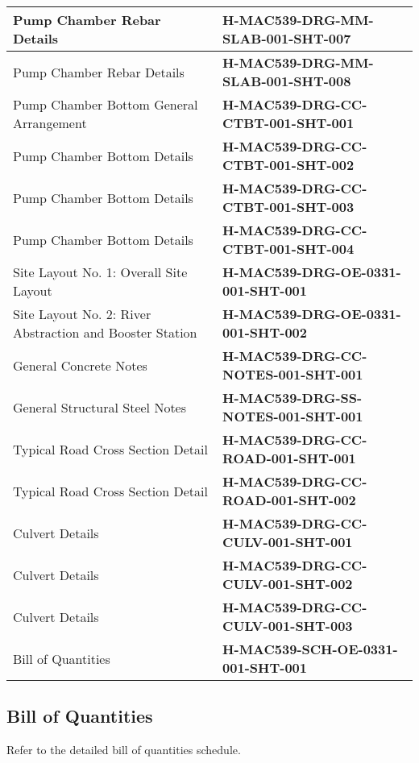 \documentclass{article}%
\begin{document}
\begin{flushleft}
\begin{minipage}{\textwidth}
\begin{tabular}{|l |l |}
Pump Chamber Rebar Details&\textbf{H{-}MAC539{-}DRG{-}MM{-}SLAB{-}001{-}SHT{-}007}\\%
\hline%
Pump Chamber Rebar Details&\textbf{H{-}MAC539{-}DRG{-}MM{-}SLAB{-}001{-}SHT{-}008}\\%
\hline%
Pump Chamber Bottom General Arrangement&\textbf{H{-}MAC539{-}DRG{-}CC{-}CTBT{-}001{-}SHT{-}001}\\%
\hline%
Pump Chamber Bottom Details&\textbf{H{-}MAC539{-}DRG{-}CC{-}CTBT{-}001{-}SHT{-}002}\\%
\hline%
Pump Chamber Bottom Details&\textbf{H{-}MAC539{-}DRG{-}CC{-}CTBT{-}001{-}SHT{-}003}\\%
\hline%
Pump Chamber Bottom Details&\textbf{H{-}MAC539{-}DRG{-}CC{-}CTBT{-}001{-}SHT{-}004}\\%
\hline%
Site Layout No. 1: Overall Site Layout&\textbf{H{-}MAC539{-}DRG{-}OE{-}0331{-}001{-}SHT{-}001}\\%
\hline%
Site Layout No. 2: River Abstraction and Booster Station&\textbf{H{-}MAC539{-}DRG{-}OE{-}0331{-}001{-}SHT{-}002}\\%
\hline%
General Concrete Notes&\textbf{H{-}MAC539{-}DRG{-}CC{-}NOTES{-}001{-}SHT{-}001}\\%
\hline%
General Structural Steel Notes&\textbf{H{-}MAC539{-}DRG{-}SS{-}NOTES{-}001{-}SHT{-}001}\\%
\hline%
Typical Road Cross Section Detail&\textbf{H{-}MAC539{-}DRG{-}CC{-}ROAD{-}001{-}SHT{-}001}\\%
\hline%
Typical Road Cross Section Detail&\textbf{H{-}MAC539{-}DRG{-}CC{-}ROAD{-}001{-}SHT{-}002}\\%
\hline%
Culvert Details&\textbf{H{-}MAC539{-}DRG{-}CC{-}CULV{-}001{-}SHT{-}001}\\%
\hline%
Culvert Details&\textbf{H{-}MAC539{-}DRG{-}CC{-}CULV{-}001{-}SHT{-}002}\\%
\hline%
Culvert Details&\textbf{H{-}MAC539{-}DRG{-}CC{-}CULV{-}001{-}SHT{-}003}\\%
\hline%
Bill of Quantities&\textbf{H{-}MAC539{-}SCH{-}OE{-}0331{-}001{-}SHT{-}001}\\%
\hline%
\end{tabular}%
\end{minipage}%
\end{flushleft}

%
\subsection{Bill of Quantities}%
\label{subsec:BillofQuantities}%
Refer to the detailed bill of quantities schedule.
\end{document}
